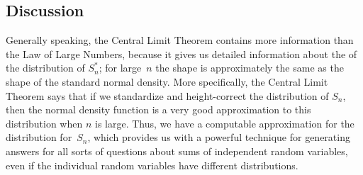\subsection*{Discussion}
Generally speaking, the Central Limit Theorem contains more information than
the Law of Large Numbers, because it gives us detailed information about the
 of the distribution of $S_n^*$; for large~$n$ the shape is
approximately the same as the shape of the standard normal density.  More specifically,
the Central Limit Theorem says that if we standardize and height-correct the distribution
of $S_n$, then the normal density function is a very good approximation to this 
distribution when $n$ is large.  Thus, we have a computable approximation for the
distribution for~$S_n$, which provides us with a powerful technique for generating answers
for all sorts of questions about sums of independent random variables, even if the individual
random variables have different distributions.

